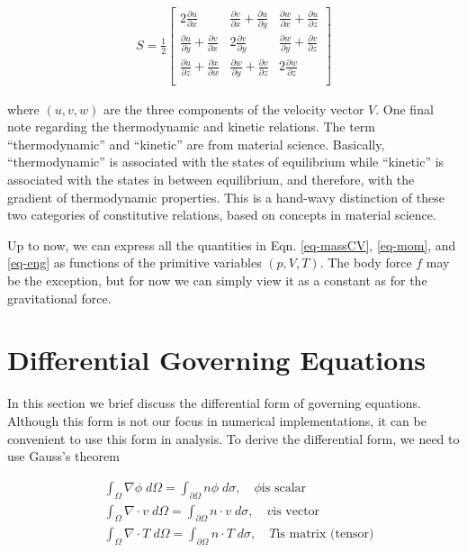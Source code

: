 \documentclass[11pt, letterpaper]{report}
\begin{document}
\begin{align*}
   S = \frac{1}{2}
   \begin{bmatrix}
      2\frac{\partial u}{\partial x} & \frac{\partial v}{\partial x}+\frac{\partial u}{\partial y} &
      \frac{\partial w}{\partial x} + \frac{\partial u}{\partial z} \\
      \frac{\partial u}{\partial y} + \frac{\partial v}{\partial x} & 2\frac{\partial v}{\partial y} &
      \frac{\partial w}{\partial y} + \frac{\partial v}{\partial z} \\
      \frac{\partial u}{\partial z} + \frac{\partial x}{\partial w} & \frac{\partial w}{\partial y}
      + \frac{\partial v}{\partial z} &   2\frac{\partial w}{\partial z} \\
   \end{bmatrix}
\end{align*}

where $(u,v,w)$ are the three components of the velocity vector $V$. One final note regarding the
thermodynamic and kinetic relations. The term ``thermodynamic'' and ``kinetic'' are from material
science. Basically, ``thermodynamic'' is associated with the states of equilibrium while
``kinetic'' is associated with the states in between equilibrium, and therefore, with the gradient
of thermodynamic properties. This is a hand-wavy distinction of these two categories of constitutive
relations, based on concepts in material science.
\paraspace

Up to now, we can express all the quantities in Eqn. \ref{eq-massCV}, \ref{eq-mom}, and \ref{eq-eng}
as functions of the primitive variables $(p,V,T)$. The body force $f$ may be the exception, but for
now we can simply view it as a constant as for the gravitational force.
\paraspace

\section{Differential Governing Equations}

In this section we brief discuss the differential form of governing equations. Although this form is
not our focus in numerical implementations, it can be convenient to use this form in analysis. To
derive the differential form, we need to use Gauss's theorem

\begin{subequations}\label{eq-Gaussthm}
   \begin{align}
      &\int_\Omega \nabla \phi \; d\Omega = \int_{\partial\Omega} n\phi \; d\sigma, \quad \phi \textrm{
         is scalar} \\
      &\int_\Omega \nabla \cdot v \; d\Omega = \int_{\partial\Omega} n \cdot v \; d\sigma, \quad v \textrm{
         is vector} \\
      &\int_\Omega \nabla \cdot T \; d\Omega = \int_{\partial\Omega} n \cdot T \; d\sigma, \quad T \textrm{
         is matrix (tensor)}
   \end{align}
\end{subequations}
\end{document}
